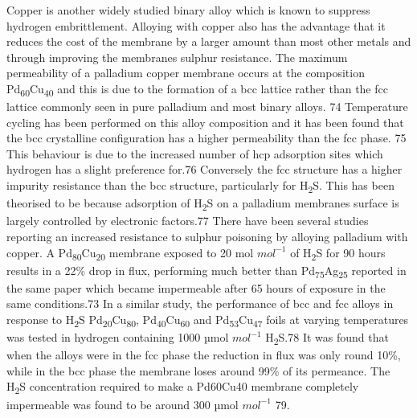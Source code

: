 Copper is another widely studied binary alloy which is known to suppress hydrogen 
embrittlement. Alloying with copper also has the advantage that it reduces the cost of the 
membrane by a larger amount than most other metals and through improving the membranes 
sulphur resistance. The maximum permeability of a palladium copper membrane occurs at the 
composition Pd\textsubscript{60}Cu\textsubscript{40} and this is due to the formation of a 
bcc lattice rather than the fcc lattice commonly seen in pure palladium and most binary 
alloys. 74 Temperature cycling has been performed on this alloy composition and it has been 
found that the bcc crystalline configuration has a higher permeability than the fcc phase. 75 
This behaviour is due to the increased number of hcp adsorption sites which hydrogen has a 
slight preference for.76 Conversely the fcc structure has a higher impurity resistance 
than the bcc structure, particularly for H\textsubscript{2}S. This has been theorised to be because 
adsorption of H\textsubscript{2}S on a palladium membranes surface is largely controlled by electronic 
factors.77 There have been several studies reporting an increased resistance to sulphur 
poisoning by alloying palladium with copper. A Pd\textsubscript{80}Cu\textsubscript{20} 
membrane exposed to 20 \textmu mol $mol^{-1}$ of H\textsubscript{2}S for 90 hours results in a 
22\% drop in flux, performing much better than Pd\textsubscript{75}Ag\textsubscript{25} reported in the same paper which 
became impermeable after 65 hours of exposure in the same conditions.73 In a similar study, 
the performance of bcc and fcc alloys in response to H\textsubscript{2}S 
Pd\textsubscript{20}Cu\textsubscript{80}, Pd\textsubscript{40}Cu\textsubscript{60} and 
Pd\textsubscript{53}Cu\textsubscript{47} foils at varying temperatures was tested in 
hydrogen containing 1000 µmol $mol^{-1}$  H\textsubscript{2}S.78 It was found that when the alloys were in the 
fcc phase the reduction in flux was only round 10\%, while in the bcc phase the membrane 
loses around 99\% of its permeance. The H\textsubscript{2}S concentration required to make a 
Pd60Cu40 membrane completely impermeable was found to be around 300 µmol $mol^{-1}$ 79.


